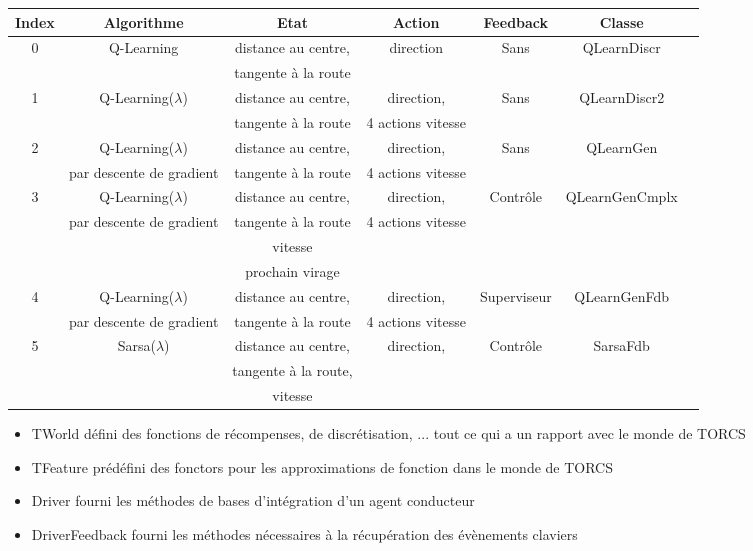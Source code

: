 \documentclass[a4paper,12pt]{article}
\begin{document}
      \begin{center}
      \begin{scriptsize}
	\begin{tabular}{|c||c|c|c|c|c|c|}
	  \hline
	  Index & Algorithme & Etat & Action & Feedback & Classe \\ \hline \hline
	  0 & Q-Learning & distance au centre,  & direction & Sans & QLearnDiscr \\ 
	  & & tangente à la route & & & \\ \hline
	  
	  1 & Q-Learning($\lambda$) & distance au centre, & 
	      direction,  & Sans & QLearnDiscr2 \\ 
	      & & tangente à la route & 4 actions vitesse & & \\ \hline

	    2 & Q-Learning($\lambda$)  & distance au centre, &
	      direction, & Sans & QLearnGen \\ 
	  & par descente de gradient & tangente à la route & 4 actions vitesse & & \\ \hline

	    3 & Q-Learning($\lambda$)  & distance au centre, &
	      direction, & Contrôle & QLearnGenCmplx \\ 
	      & par descente de gradient & tangente à la route & 4 actions vitesse & & \\
	      &  & vitesse &  & & \\
	  &  & prochain virage &  & & \\ \hline
	  
	    4 & Q-Learning($\lambda$)  & distance au centre, &
	      direction, & Superviseur & QLearnGenFdb \\ 
	      & par descente de gradient & tangente à la route & 4 actions vitesse & & \\  \hline
	  
	    5 & Sarsa($\lambda$)  & distance au centre, &
	      direction, & Contrôle & SarsaFdb \\ 
	      & & tangente à la route, & & & \\ 
	      & & vitesse & & & \\  \hline

	\end{tabular}
      \end{scriptsize}
      \end{center}
      
      \begin{itemize}
       \item TWorld défini des fonctions de récompenses, de discrétisation, ... tout ce qui a un rapport avec le monde de TORCS
       \item TFeature prédéfini des fonctors pour les approximations de fonction dans le monde de TORCS
       \item Driver fourni les méthodes de bases d'intégration d'un agent conducteur
       \item DriverFeedback fourni les méthodes nécessaires à la récupération des évènements claviers
      \end{itemize}
      
\end{document}
